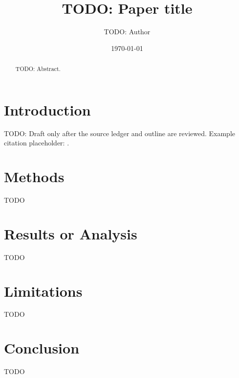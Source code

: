 \documentclass{article}
\title{TODO: Paper title}
\author{TODO: Author}
\date{\today}
\begin{document}
\maketitle

\begin{abstract}
TODO: Abstract.
\end{abstract}

\section{Introduction}
TODO: Draft only after the source ledger and outline are reviewed. Example
citation placeholder: \cite{replace-me}.

\section{Methods}
TODO

\section{Results or Analysis}
TODO

\section{Limitations}
TODO

\section{Conclusion}
TODO



\end{document}
